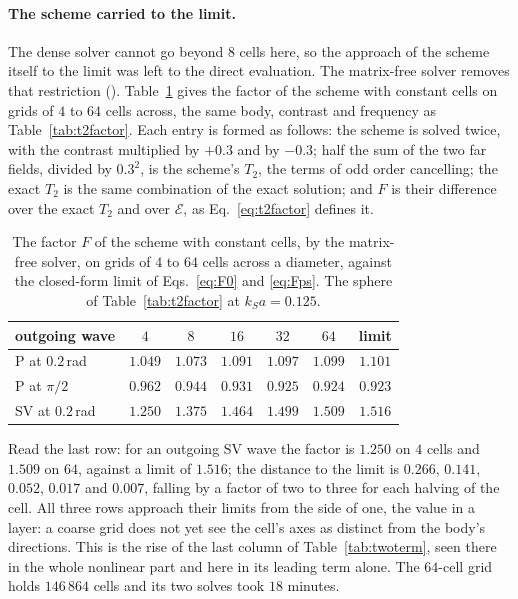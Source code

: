 \documentclass[11pt,a4paper]{article}
\newcommand{\cE}{\mathcal{E}}
\begin{document}
\paragraph{The scheme carried to the limit.} The dense solver cannot go beyond $8$ cells here, so the
approach of the scheme itself to the limit was left to the direct evaluation. The matrix-free solver
removes that restriction (). Table~\ref{tab:t2factorfft} gives the
factor of the scheme with constant cells on grids of $4$ to $64$ cells across, the same body, contrast and
frequency as Table~\ref{tab:t2factor}. Each entry is formed as follows: the scheme is solved twice, with
the contrast multiplied by $+0.3$ and by $-0.3$; half the sum of the two far fields, divided by $0.3^2$, is
the scheme's $T_2$, the terms of odd order cancelling; the exact $T_2$ is the same combination of the exact
solution; and $F$ is their difference over the exact $T_2$ and over $\cE$, as Eq.~\eqref{eq:t2factor}
defines it.
\begin{table}[htbp]
\centering
\caption{The factor $F$ of the scheme with constant cells, by the matrix-free solver, on grids of $4$ to
$64$ cells across a diameter, against the closed-form limit of Eqs.~\eqref{eq:F0} and \eqref{eq:Fps}. The
sphere of Table~\ref{tab:t2factor} at $k_Sa=0.125$.}\label{tab:t2factorfft}
\small
\begin{tabular}{@{}lcccccc@{}}
\toprule
outgoing wave & $4$ & $8$ & $16$ & $32$ & $64$ & limit \\
\midrule
P at $0.2$\,rad  & $1.049$ & $1.073$ & $1.091$ & $1.097$ & $1.099$ & $1.101$ \\
P at $\pi/2$     & $0.962$ & $0.944$ & $0.931$ & $0.925$ & $0.924$ & $0.923$ \\
SV at $0.2$\,rad & $1.250$ & $1.375$ & $1.464$ & $1.499$ & $1.509$ & $1.516$ \\
\bottomrule
\end{tabular}
\end{table}
Read the last row: for an outgoing SV wave the factor is $1.250$ on $4$ cells and $1.509$ on $64$, against
a limit of $1.516$; the distance to the limit is $0.266$, $0.141$, $0.052$, $0.017$ and $0.007$, falling
by a factor of two to three for each halving of the cell. All three rows approach their limits from the
side of one, the value in a layer: a coarse grid does not yet see the cell's axes as distinct from the
body's directions. This is the rise of the last column of Table~\ref{tab:twoterm}, seen there in the
whole nonlinear part and here in its leading term alone. The $64$-cell grid holds $146\,864$ cells and
its two solves took $18$ minutes.
\end{document}
